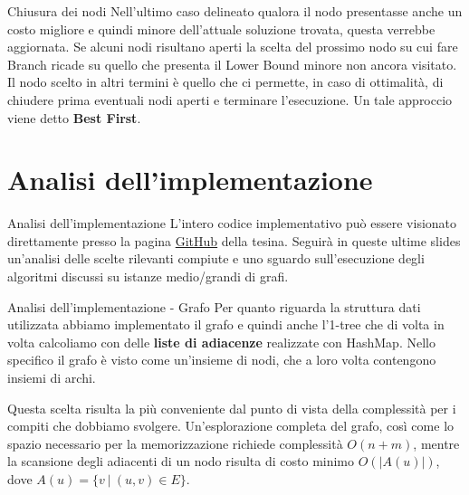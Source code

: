 \documentclass[10pt]{beamer}
\begin{document}
    \begin{frame}{Chiusura dei nodi}
        Nell'ultimo caso delineato qualora il nodo presentasse anche un costo migliore e quindi minore dell'attuale soluzione trovata, questa verrebbe aggiornata.
        \newline
        \newline
        Se alcuni nodi risultano aperti la scelta del prossimo nodo su cui fare Branch ricade su quello che presenta il Lower Bound minore non ancora visitato.\newline
        Il nodo scelto in altri termini è quello che ci permette, in caso di ottimalità, di chiudere prima eventuali nodi aperti e terminare l'esecuzione.
        Un tale approccio viene detto \textbf{Best First}.
    \end{frame}


    \section{Analisi dell'implementazione}\label{sec:analisi-dell'implementazione}
    \begin{frame}{Analisi dell'implementazione}
        L'intero codice implementativo può essere visionato direttamente presso la pagina \href{https://github.com/LorenzoSciandra/TesinaOttimizzazioneCombinatoria}{GitHub} della tesina.
        Seguirà in queste ultime slides un'analisi delle scelte rilevanti compiute e uno sguardo sull'esecuzione degli algoritmi discussi su istanze medio/grandi di grafi.
    \end{frame}

    \begin{frame}{Analisi dell'implementazione - Grafo}
        Per quanto riguarda la struttura dati utilizzata abbiamo implementato il grafo e quindi anche l'1-tree che di volta in volta calcoliamo con delle \textbf{liste di adiacenze} realizzate con HashMap.\newline
        Nello specifico il grafo è visto come un'insieme di nodi, che a loro volta contengono insiemi di archi.

        Questa scelta risulta la più conveniente dal punto di vista della complessità per i compiti che dobbiamo svolgere.
        Un'esplorazione completa del grafo, così come lo spazio necessario per la memorizzazione richiede complessità $O(n+m)$, mentre la scansione degli adiacenti di un nodo risulta di costo minimo $O(|A(u)|)$, dove $A(u) = \{v \:|\: (u,v) \in E\}$.
    \end{frame}
\end{document}
